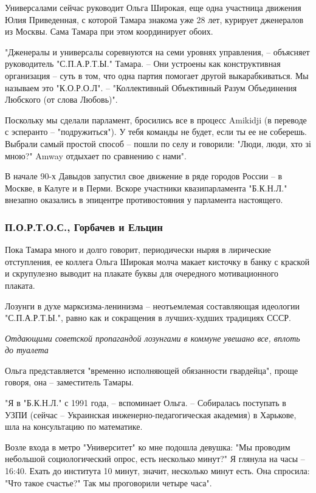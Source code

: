 Универсалами сейчас руководит Ольга Широкая, еще одна участница движения Юлия
Приведенная, с которой Тамара знакома уже 28 лет, курирует дженералов из
Москвы. Сама Тамара при этом координирует обоих.

"Дженералы и универсалы соревнуются на семи уровнях управления, – объясняет
руководитель "С.П.А.Р.Т.Ы." Тамара. – Они устроены как конструктивная
организация – суть в том, что одна партия помогает другой выкарабкиваться. Мы
называем это "К.О.Р.О.Л". – "Коллективный Объективный Разум Объединения
Любского (от слова Любовь)". 

Поскольку мы сделали парламент, бросились все в процесс Amikidji (в переводе с
эсперанто – "подружиться"). У тебя команды не будет, если ты ее не соберешь.
Выбрали самый простой способ – пошли по селу и говорили: "Люди, люди, хто зі
мною?" Amway отдыхает по сравнению с нами".

В начале 90-х Давыдов запустил свое движение в ряде городов России – в Москве,
в Калуге и в Перми. Вскоре участники квазипарламента "Б.К.Н.Л." внезапно
оказались в эпицентре противостояния у парламента настоящего.

\subsubsection{П.О.Р.Т.О.С., Горбачев и Ельцин}

Пока Тамара много и долго говорит, периодически ныряя в лирические отступления,
ее коллега Ольга Широкая молча макает кисточку в банку с краской и скрупулезно
выводит на плакате буквы для очередного мотивационного плаката. 

Лозунги в духе марксизма-ленинизма – неотъемлемая составляющая идеологии
"С.П.А.Р.Т.Ы.", равно как и сокращения в лучших-худших традициях СССР.

\emph{Отдающими советской пропагандой лозунгами в коммуне увешано все, вплоть до туалета}

Ольга представляется "временно исполняющей обязанности гвардейца", проще
говоря, она – заместитель Тамары.

"Я в "Б.К.Н.Л." с 1991 года, – вспоминает Ольга. – Собиралась поступать в УЗПИ
(сейчас – Украинская инженерно-педагогическая академия) в Харькове, шла на
консультацию по математике. 

Возле входа в метро "Университет" ко мне подошла девушка: "Мы проводим
небольшой социологический опрос, есть несколько минут?" Я глянула на часы –
16:40. Ехать до института 10 минут, значит, несколько минут есть. Она спросила:
"Что такое счастье?" Так мы проговорили четыре часа".

